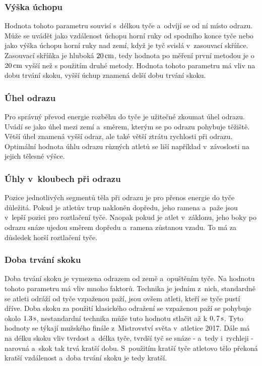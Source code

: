 \subsubsection{Výška úchopu}

Hodnota tohoto parametru souvisí s~délkou tyče a~odvíjí se od ní místo odrazu. Může se uvádět jako vzdálenost úchopu horní ruky od spodního konce tyče nebo jako výška úchopu horní ruky nad zemí, když je tyč svislá v~zasouvací skříňce. Zasouvací skříňka je hluboká $20\,\rm cm$, tedy hodnota po měření první metodou je o $20\,\rm cm$ vyšší než s použitím druhé metody. Hodnota tohoto parametru má vliv na dobu trvání skoku, vyšší úchup znamená delší dobu trvání skoku.

\subsubsection{Úhel odrazu}

Pro správný převod energie rozběhu do tyče je užitečné zkoumat úhel odrazu. Uvádí se jako úhel mezi zemí a~směrem, kterým se po odrazu pohybuje těžiště. Větší úhel znamená vyšší odraz, ale také větší ztrátu rychlosti při odrazu. Optimální hodnota úhlu odrazu různých atletů se liší například v~závoslosti na jejich tělesné výšce.

\subsubsection{Úhly v~kloubech při odrazu}

Pozice jednotlivých segmentů těla při odrazu je pro přenos energie do tyče důležitá. Pokud je atletův trup nakloněn dopředu, jeho ramena a~paže jsou v~lepší pozici pro roztlačení tyče. Naopak pokud je atlet v~záklonu, jeho boky po odrazu snáze ujedou směrem dopředu a~ramena zůstanou vzadu. To má za důsledek horší roztlačení tyče.

\subsubsection{Doba trvání skoku}

Doba trvání skoku je vymezena odrazem od země a~opuštěním tyče. Na hodnotu tohoto parametru má vliv mnoho faktorů. Technika je jedním z~nich, standardně se atleti odráží od tyče vzpaženou paží, jsou ovšem atleti, kteří se tyče pustí dříve. Doba skoku za použití klasického odražení se vzpaženou paží se pohybuje okolo $1.3\,\rm s$, nestandardní technika může tuto hodnotu stlačit až k $0,7\,\rm s$. Tyto hodnoty se týkají mužského finále z~Mistrovství světa v~atletice 2017. Dále má na délku skoku vliv tvrdost a~délka tyče, tvrdší tyč se snáze - a~tedy i~rychleji - narovná a~skok tak trvá kratší dobu. S~použitím kratší tyče atletovo tělo překoná kratší vzdálenost a~doba trvání skoku je tedy kratší.

